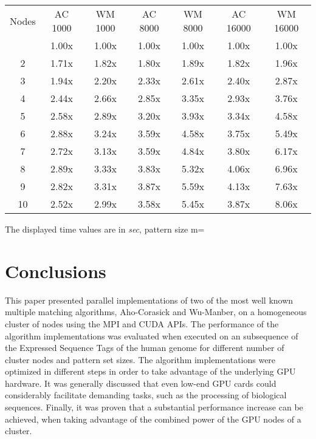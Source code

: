 \documentclass{ws-ijait}
\begin{document}
\begin{table}[h]
{\begin{tabular}{@{}c | cc |cc|cc@{}} \toprule
Nodes & AC 1000 & WM 1000 & AC 8000 & WM 8000 & AC 16000 & WM 16000\\
\colrule
1 & 1.00x & 1.00x & 1.00x & 1.00x & 1.00x & 1.00x\\
2 & 1.71x & 1.82x & 1.80x & 1.89x & 1.82x & 1.96x\\
3 & 1.94x & 2.20x & 2.33x & 2.61x & 2.40x & 2.87x\\
4 & 2.44x & 2.66x & 2.85x & 3.35x & 2.93x & 3.76x\\
5 & 2.58x & 2.89x & 3.20x & 3.93x & 3.34x & 4.58x\\
6 & 2.88x & 3.24x & 3.59x & 4.58x & 3.75x & 5.49x\\
7 & 2.72x & 3.13x & 3.59x & 4.84x & 3.80x & 6.17x\\
8 & 2.89x & 3.33x & 3.83x & 5.32x & 4.06x & 6.96x\\
9 & 2.82x & 3.31x & 3.87x & 5.59x & 4.13x & 7.63x\\
10 & 2.52x & 2.99x & 3.58x & 5.45x & 3.87x & 8.06x\\
\hline
\end{tabular}}
\begin{tabnote}
The displayed time values are in \textit{sec}, pattern size m=
\end{tabnote}
\label{tbl:overall-execution-speedup}
\end{table}

 
 
 


\clearpage

\section{Conclusions}
\label{sec:conclusions}

This paper presented parallel implementations of two of the most well known multiple matching algorithms, Aho-Corasick and Wu-Manber, on a homogeneous cluster of nodes using the MPI and CUDA APIs. The performance of the algorithm implementations was evaluated when executed on an subsequence of the Expressed Sequence Tags of the human genome for different number of cluster nodes and pattern set sizes. The algorithm implementations were optimized in different steps in order to take advantage of the underlying GPU hardware. It was generally discussed that even low-end GPU cards could considerably facilitate demanding tasks, such as the processing of biological sequences. Finally, it was proven that a substantial performance increase can be achieved, when taking advantage of the combined power of the GPU nodes of a cluster.
\end{document}
